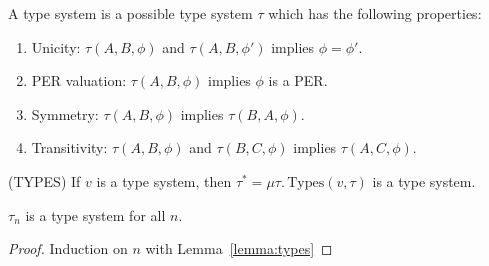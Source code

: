 A type system is a possible type system $\tau$ which has the following properties:
\begin{enumerate}
\item Unicity: $\tau(A,B,\phi)$ and $\tau(A,B,\phi')$ implies $\phi = \phi'$.
\item PER valuation: $\tau(A,B,\phi)$ implies $\phi$ is a PER.
\item Symmetry: $\tau(A,B,\phi)$ implies $\tau(B,A,\phi)$. 
\item Transitivity: $\tau(A,B,\phi)$ and $\tau(B,C,\phi)$ implies $\tau(A,C,\phi)$.
\end{enumerate}

\begin{lemma}(TYPES)\label{lemma:types}
If $v$ is a type system, then $\tau^* = \mu \tau.\, \text{Types}(v,\tau)$ is a type system.
\end{lemma}


\begin{lemma}
$\tau_n$ is a type system for all $n$.
\end{lemma}

\begin{proof}
  Induction on $n$ with Lemma~\ref{lemma:types}
\end{proof}
